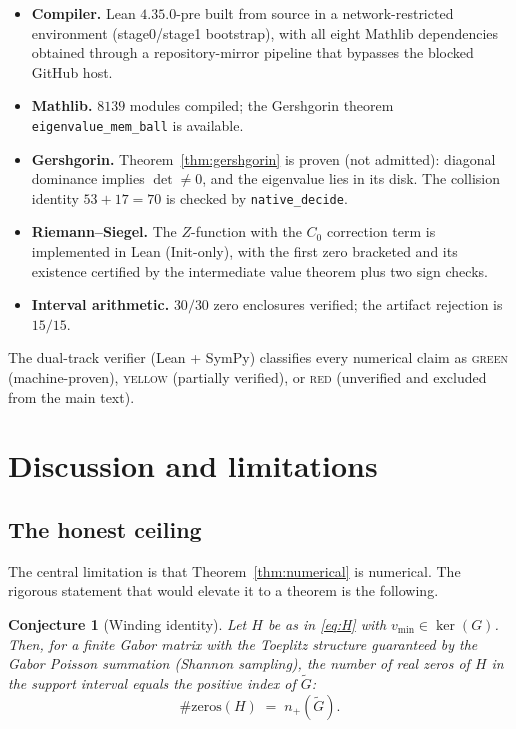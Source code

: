 \documentclass[11pt]{article}
\newtheorem{conjecture}[theorem]{Conjecture}
\begin{document}
\begin{itemize}
\item \textbf{Compiler.} Lean $4.35.0$-pre built from source in a network-restricted environment (stage0/stage1 bootstrap), with all eight Mathlib dependencies obtained through a repository-mirror pipeline that bypasses the blocked GitHub host.
\item \textbf{Mathlib.} $8139$ modules compiled; the Gershgorin theorem \texttt{eigenvalue\_mem\_ball} is available.
\item \textbf{Gershgorin.} Theorem~\ref{thm:gershgorin} is proven (not admitted): diagonal dominance implies $\det\neq0$, and the eigenvalue lies in its disk. The collision identity $53+17=70$ is checked by \texttt{native\_decide}.
\item \textbf{Riemann--Siegel.} The $Z$-function with the $C_0$ correction term is implemented in Lean (Init-only), with the first zero bracketed and its existence certified by the intermediate value theorem plus two sign checks.
\item \textbf{Interval arithmetic.} $30/30$ zero enclosures verified; the artifact rejection is $15/15$.
\end{itemize}

The dual-track verifier (Lean + SymPy) classifies every numerical claim as \textsc{green} (machine-proven), \textsc{yellow} (partially verified), or \textsc{red} (unverified and excluded from the main text).

\section{Discussion and limitations}

\subsection{The honest ceiling}

The central limitation is that Theorem~\ref{thm:numerical} is numerical. The rigorous statement that would elevate it to a theorem is the following.

\begin{conjecture}[Winding identity]\label{sec:conjecture}
Let $H$ be as in \eqref{eq:H} with $v_{\min}\in\ker(G)$. Then, for a finite Gabor matrix with the Toeplitz structure guaranteed by the Gabor Poisson summation (Shannon sampling), the number of real zeros of $H$ in the support interval equals the positive index of $\tilde G$:
\begin{equation}
\#\mathrm{zeros}(H)\;=\;n_+(\tilde G).
\end{equation}
\end{conjecture}
\end{document}
